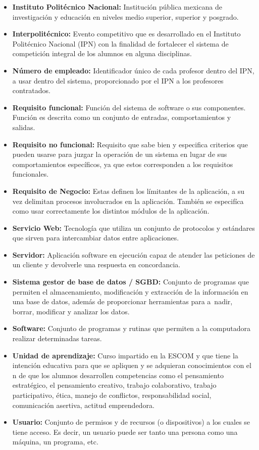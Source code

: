 \begin{itemize}
		\item \textbf{Instituto Politécnico Nacional:} Institución pública mexicana de investigación y educación en niveles medio superior, superior y posgrado. 
		\item \textbf{Interpolitécnico:} Evento competitivo que es desarrollado en el Instituto Politécnico Nacional (IPN) con la finalidad de fortalecer el sistema de competición integral de los alumnos en alguna disciplinas.
		\item \textbf{Número de empleado:} Identificador único de cada profesor dentro del IPN, a usar dentro del sistema, proporcionado por el IPN a los profesores contratados. 
		\item \textbf{Requisito funcional:} Función del sistema de software o sus componentes. Función es descrita como un conjunto de entradas, comportamientos y salidas. 
		\item \textbf{Requisito no funcional:} Requisito que sabe bien y especifica criterios que pueden usarse para juzgar la operación de un sistema en lugar de sus comportamientos específicos, ya que estos corresponden a los requisitos funcionales. 
		\item \textbf{Requisito de Negocio:} Estas definen los límitantes de la aplicación, a su vez delimitan procesos involucrados en la aplicación. También se especifíca como usar correctamente los distintos módulos de la aplicación.
		\item \textbf{Servicio Web:} Tecnología que utiliza un conjunto de protocolos y estándares que sirven para intercambiar datos entre aplicaciones.
		\item \textbf{Servidor:} Aplicación software en ejecución capaz de atender las peticiones de un cliente y devolverle una respuesta en concordancia.
		\item \textbf{Sistema gestor de base de datos / SGBD:} Conjunto de programas que permiten el almacenamiento, modificación y extracción de la información en una base de datos, además de proporcionar herramientas para a~nadir, borrar, modificar y analizar los datos.
		\item \textbf{Software:} Conjunto de programas y rutinas que permiten a la computadora realizar determinadas tareas.
		\item \textbf{Unidad de aprendizaje:} Curso impartido en la ESCOM y que tiene la intención educativa para que se apliquen y se adquieran conocimientos con el n de que los alumnos desarrollen competencias como el pensamiento estratégico, el pensamiento creativo, trabajo colaborativo, trabajo participativo, ética, manejo de conflictos, responsabilidad social, comunicación asertiva, actitud emprendedora.
		\item \textbf{Usuario:} Conjunto de permisos y de recursos (o dispositivos) a los cuales se tiene acceso. Es decir, un usuario puede ser tanto una persona como una máquina, un programa, etc.
	\end{itemize}

